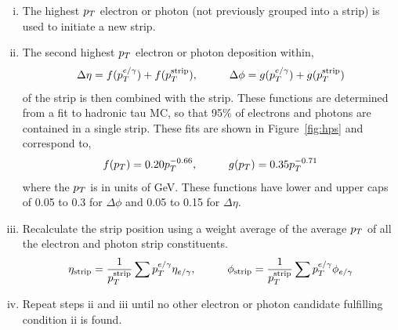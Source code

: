 \begin{enumerate}[i)]
\item The highest $p_{T}$ electron or photon (not previously grouped into a strip) is used to initiate a new strip.
\item The second highest $p_{T}$ electron or photon deposition within,
\begin{equation}
  \Delta \eta = f(p_{T}^{e/\gamma}) + f(p_{T}^{\text{strip}}), \hspace{1cm} \Delta \phi = g(p_{T}^{e/\gamma}) + g(p_{T}^{\text{strip}})
\end{equation}
of the strip is then combined with the strip.
These functions are determined from a fit to hadronic tau MC, so that 95\% of electrons and photons are contained in a single strip.
These fits are shown in Figure~\ref{fig:hps} and correspond to,
\begin{equation}
f(p_{T}) = 0.20 p_{T}^{-0.66}, \hspace{1cm} g(p_{T}) = 0.35 p_{T}^{-0.71}
\end{equation}
where the $p_{T}$ is in units of GeV.
These functions have lower and upper caps of 0.05 to 0.3 for $\Delta\phi$ and 0.05 to 0.15 for $\Delta\eta$.
\item Recalculate the strip position using a weight average of the average $p_{T}$ of all the electron and photon strip constituents.
\begin{equation}
\eta_{\text{strip}} = \frac{1}{p_{T}^{\text{strip}}} \sum p_{T}^{e/\gamma} \eta_{e/\gamma}, \hspace{1cm} \phi_{\text{strip}} = \frac{1}{p_{T}^{\text{strip}}} \sum p_{T}^{e/\gamma} \phi_{e/\gamma}
\end{equation}
\item Repeat steps ii and iii until no other electron or photon candidate fulfilling condition ii is found.
\end{enumerate}


